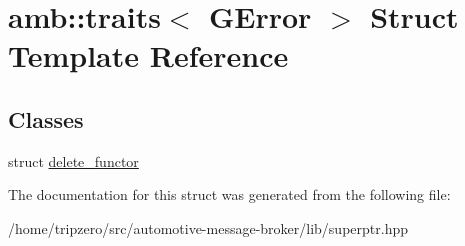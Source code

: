\hypertarget{structamb_1_1traits_3_01GError_01_4}{\section{amb\-:\-:traits$<$ G\-Error $>$ Struct Template Reference}
\label{structamb_1_1traits_3_01GError_01_4}
}
\subsection*{Classes}
\begin{DoxyCompactItemize}
\item 
struct \hyperlink{structamb_1_1traits_3_01GError_01_4_1_1delete__functor}{delete\-\_\-functor}
\end{DoxyCompactItemize}


The documentation for this struct was generated from the following file\-:\begin{DoxyCompactItemize}
\item 
/home/tripzero/src/automotive-\/message-\/broker/lib/superptr.\-hpp\end{DoxyCompactItemize}
